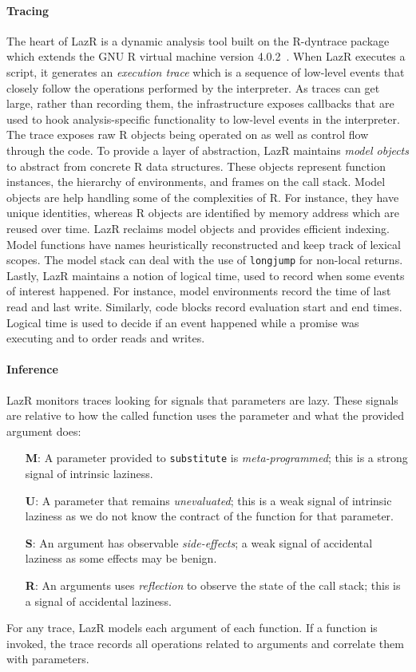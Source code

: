 \documentclass[review,creen,acmsmall]{acmart}
\newcommand{\rdyn}{{\sf R-dyntrace}\xspace}
\renewcommand{\c}[1]{\lstinline |#1|\xspace}
\newcommand{\lazr}{{\sf LazR}\xspace}
\begin{document}
\paragraph{Tracing}
The heart of \lazr is a dynamic analysis tool built on the \rdyn package which
extends the GNU R virtual machine version 4.0.2~\cite{oopsla19b}. When \lazr
executes a script, it generates an \emph{execution trace} which is a sequence of
low-level events that closely follow the operations performed by the
interpreter. As traces can get large, rather than recording them, the
infrastructure exposes callbacks that are used to hook analysis-specific
functionality to low-level events in the interpreter. The trace exposes raw R
objects being operated on as well as control flow through the code.
To provide a layer of abstraction, \lazr maintains \emph{model objects} to
abstract from concrete R data structures. These objects represent function
instances, the hierarchy of environments, and frames on the call stack. Model
objects are help handling some of the complexities of R. For instance, they have
unique identities, whereas R objects are identified by memory address which are
reused over time. \lazr reclaims model objects and provides efficient indexing.
Model functions have names heuristically reconstructed and keep track of lexical
scopes. The model stack can deal with the use of \c{longjump} for non-local
returns. Lastly, \lazr maintains a notion of logical time, used to record when
some events of interest happened. For instance, model environments record the
time of last read and last write. Similarly, code blocks record evaluation start
and end times. Logical time is used to decide if an event happened while a
promise was executing and to order reads and writes.

\paragraph{Inference}
\lazr monitors traces looking for signals that parameters are lazy. These
signals are relative to how the called function uses the parameter and what the
provided argument does:
\begin{itemize}
\item[{\bf M}:] A parameter provided to \c{substitute} is
  \emph{meta-programmed}; this is a strong signal of intrinsic laziness.
\item[{\bf U}:] A parameter that remains \emph{unevaluated}; this is a weak
  signal of intrinsic laziness as we do not know the contract of the function
  for that parameter.
\item [{\bf S}:] An argument has observable \emph{side-effects}; a weak signal
  of accidental laziness as some effects may be benign.
\item[{\bf R}:] An arguments uses \emph{reflection} to observe the state of the
  call stack; this is a signal of accidental laziness.
\end{itemize}
\noindent
For any trace, \lazr models each argument of each function. If a function is
invoked, the trace records all operations related to arguments and correlate
them with parameters.
\end{document}

